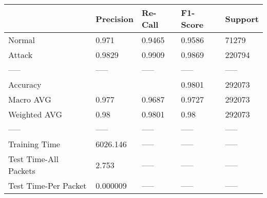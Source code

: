 \begin{tabular}{lllll}
\toprule
{} & Precision & Re-Call & F1-Score & Support \\
\midrule
Normal                &     0.971 &  0.9465 &   0.9586 &   71279 \\
Attack                &    0.9829 &  0.9909 &   0.9869 &  220794 \\
-----                 &     ----- &   ----- &    ----- &   ----- \\
Accuracy              &           &         &   0.9801 &  292073 \\
Macro AVG             &     0.977 &  0.9687 &   0.9727 &  292073 \\
Weighted AVG          &      0.98 &  0.9801 &     0.98 &  292073 \\
-----                 &     ----- &   ----- &    ----- &   ----- \\
Training Time         &  6026.146 &   ----- &    ----- &   ----- \\
Test Time-All Packets &     2.753 &   ----- &    ----- &   ----- \\
Test Time-Per Packet  &  0.000009 &   ----- &    ----- &   ----- \\
\bottomrule
\end{tabular}
